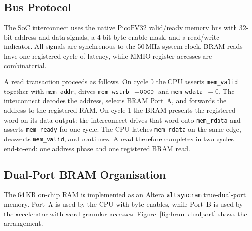 \subsection{Bus Protocol}

The SoC interconnect uses the native PicoRV32 valid/ready memory bus with
32-bit address and data signals, a 4-bit byte-enable mask, and a
read/write indicator. All signals are synchronous to the 50\,MHz system
clock. BRAM reads have one registered cycle of latency, while MMIO
register accesses are combinatorial.

A read transaction proceeds as follows. On cycle 0 the CPU asserts
\texttt{mem\_valid} together with \texttt{mem\_addr}, drives
\texttt{mem\_wstrb}~$=\texttt{0000}$ and \texttt{mem\_wdata}~$=0$. The
interconnect decodes the address, selects BRAM Port~A, and forwards
the address to the registered RAM. On cycle 1 the BRAM presents the
registered word on its data output; the interconnect drives that word
onto \texttt{mem\_rdata} and asserts \texttt{mem\_ready} for one cycle.
The CPU latches \texttt{mem\_rdata} on the same edge, deasserts
\texttt{mem\_valid}, and continues. A read therefore completes in two
cycles end-to-end: one address phase and one registered BRAM read.

\subsection{Dual-Port BRAM Organisation}

The 64\,KB on-chip RAM is implemented as an Altera \texttt{altsyncram}
true-dual-port memory. Port~A is used by the CPU with byte enables, while
Port~B is used by the accelerator with word-granular accesses.
Figure~\ref{fig:bram-dualport} shows the arrangement.

